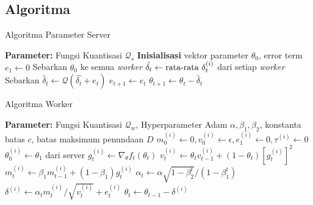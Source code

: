 \subsection{Algoritma}
\begin{frame}{Algoritma Parameter Server}
  \begin{algorithm}[H]
    \caption{Algoritma Parameter Server}
    \begin{algorithmic}[1]
      \State \textbf{Parameter:} Fungsi Kuantisasi $\mathcal{Q}_s$
      \State \textbf{Inisialisasi} vektor parameter $\theta_0$, error term $e_1 \gets 0$
      \State Sebarkan $\theta_0$ ke semua \textit{worker}
      \State $\hat{\delta_t} \gets \textnormal{rata-rata } \delta_t^{(i)}$ dari setiap \textit{worker}
      \State Sebarkan $\tilde{\delta_t} \gets \mathcal{Q}(\hat{\delta_t} + e_t)$
      \State $e_{t+1} \gets e_{t}$
      \State $\theta_{t+1} \gets \theta_t - \tilde{\delta_t}$
      \EndFor
    \end{algorithmic}
  \end{algorithm}
\end{frame}

\begin{frame}{Algoritma Worker}
  \begin{algorithm}[H]
    \caption{Modifikasi Adam untuk Worker ke-$i$}
    \begin{algorithmic}[1]
      \State \textbf{Parameter:} Fungsi Kuantisasi $\mathcal{Q}_w$, Hyperparameter Adam $\alpha, \beta_1, \beta_2$, konstanta batas $c$, batas maksimum penundaan $D$
      \State $m_0^{(i)} \gets 0, v_0^{(i)} \gets \epsilon, e_1^{(i)} \gets 0, \tau^{(i)} \gets 0$
      \State $\theta^{(i)}_0 \gets \theta_1$ dari server
      \State $g_t^{(i)} \gets \nabla_\theta f_t(\theta_{t})$
      \State $v_t^{(i)} \gets \theta_t v_{t-1}^{(i)} + (1-\theta_t)[g_t^{(i)}]^2$
      \State $m_t^{(i)} \gets \beta_1 m_{t-1}^{(i)} + (1-\beta_1)g_t^{(i)}$
      \State $\alpha_t \gets \alpha \sqrt{1-\beta_2^t}/(1-\beta_1^t)$
      \State $\delta^{(i)} \gets \alpha_t m_t^{(i)}/\sqrt{v_t^{(i)}}+e_t^{(i)}$
      \State $\theta_t \gets \theta_{t-1} - \delta^{(i)}$
    \end{algorithmic}
  \end{algorithm}
\end{frame}


